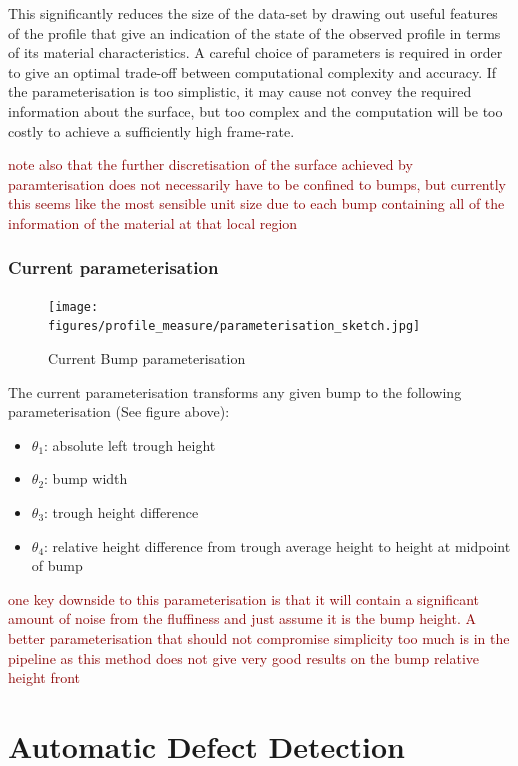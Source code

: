 \documentclass[12pt]{report}
\newcommand{\tcr}[1]{\textcolor{darkRed}{#1}}
\begin{document}
        This significantly reduces the size of the data-set by drawing out useful features of the profile that give an indication of the state of the observed profile in terms of its material characteristics. A careful choice of parameters is required in order to give an optimal trade-off between computational complexity and accuracy. If the parameterisation is too simplistic, it may cause not convey the required information about the surface, but too complex and the computation will be too costly to achieve a sufficiently high frame-rate.
        
        \tcr{note also that the further discretisation of the surface achieved by paramterisation does not necessarily have to be confined to bumps, but currently this seems like the most sensible unit size due to each bump containing all of the information of the material at that local region}
        
        \subsection{Current parameterisation}
            \begin{figure}
                \centering
                \texttt{[image: figures/profile\_measure/parameterisation\_sketch.jpg]}
                \caption{Current Bump parameterisation}
            \end{figure}
            The current parameterisation transforms any given bump to the following parameterisation (See figure above):
            \begin{itemize}
                \item $\theta_1$: absolute left trough height
                \item $\theta_2$: bump width
                \item $\theta_3$: trough height difference
                \item $\theta_4$: relative height difference from trough average height to height at midpoint of bump 
            \end{itemize}
            \tcr{one key downside to this parameterisation is that it will contain a significant amount of noise from the fluffiness and just assume it is the bump height. A better parameterisation that should not compromise simplicity too much is in the pipeline as this method does not give very good results on the bump relative height front}

\chapter{Automatic Defect Detection}
\end{document}
